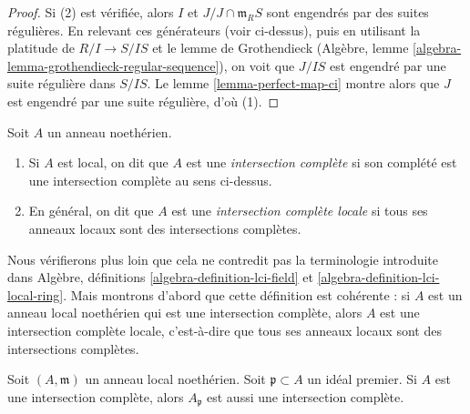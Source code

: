 \begin{proof}
\medskip\noindent
Si (2) est vérifiée, alors $I$ et $J/J \cap \mathfrak m_RS$
sont engendrés par des suites régulières. En relevant ces générateurs
(voir ci-dessus), puis en utilisant la platitude de $R/I \to S/IS$
et le lemme de Grothendieck
(Algèbre, lemme \ref{algebra-lemma-grothendieck-regular-sequence}),
on voit que $J/IS$ est engendré par une suite régulière dans $S/IS$.
Le lemme \ref{lemma-perfect-map-ci} montre alors que $J$
est engendré par une suite régulière, d'où (1).
\end{proof}

\begin{definition}
\label{definition-lci}
Soit $A$ un anneau noethérien.
\begin{enumerate}
\item Si $A$ est local, on dit que $A$ est une {\it intersection complète}
si son complété est une intersection complète au sens ci-dessus.
\item En général, on dit que $A$ est une {\it intersection complète locale}
si tous ses anneaux locaux sont des intersections complètes.
\end{enumerate}
\end{definition}

\noindent
Nous vérifierons plus loin que cela ne contredit pas la terminologie
introduite dans
Algèbre, définitions \ref{algebra-definition-lci-field} et
\ref{algebra-definition-lci-local-ring}.
Mais montrons d'abord que cette définition est cohérente : si $A$ est un
anneau local noethérien qui est une intersection complète, alors $A$ est une
intersection complète locale, c'est-à-dire que tous ses anneaux locaux sont
des intersections complètes.

\begin{lemma}
\label{lemma-ci-good}
Soit $(A, \mathfrak m)$ un anneau local noethérien. Soit
$\mathfrak p \subset A$ un idéal premier. Si $A$ est une intersection
complète, alors $A_\mathfrak p$ est aussi une intersection complète.
\end{lemma}

